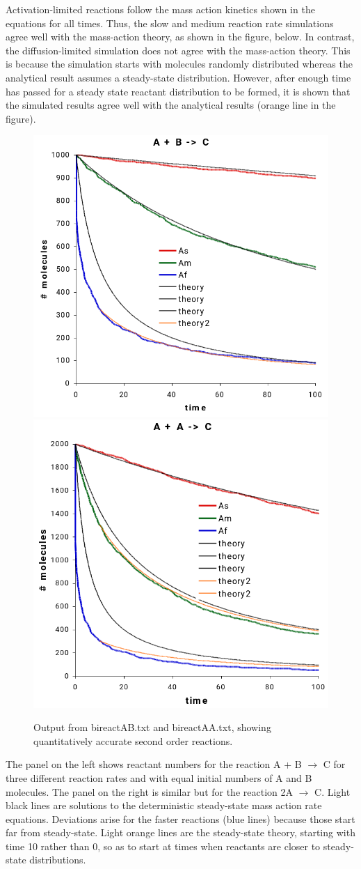 \documentclass {book}
\begin{document}
Activation-limited reactions follow the mass action kinetics shown in the equations for all times. Thus, the slow and medium reaction rate simulations agree well with the mass-action theory, as shown in the figure, below. In contrast, the diffusion-limited simulation does not agree with the mass-action theory. This is because the simulation starts with molecules randomly distributed whereas the analytical result assumes a steady-state distribution. However, after enough time has passed for a steady state reactant distribution to be formed, it is shown that the simulated results agree well with the analytical results (orange line in the figure).

\begin{figure}[h]
\centering
\includegraphics[height=5 cm]{figures/image38}
\includegraphics[height=5 cm]{figures/image39}
\caption{Output from bireactAB.txt and bireactAA.txt, showing quantitatively accurate second order reactions.}
\label{fig:bireactAB}
\end{figure}

The panel on the left shows reactant numbers for the reaction A + B $\rightarrow$ C for three different reaction rates and with equal initial numbers of A and B molecules. The panel on the right is similar but for the reaction 2A $\rightarrow$ C. Light black lines are solutions to the deterministic steady-state mass action rate equations. Deviations arise for the faster reactions (blue lines) because those start far from steady-state. Light orange lines are the steady-state theory, starting with time 10 rather than 0, so as to start at times when reactants are closer to steady-state distributions.
\end{document}
